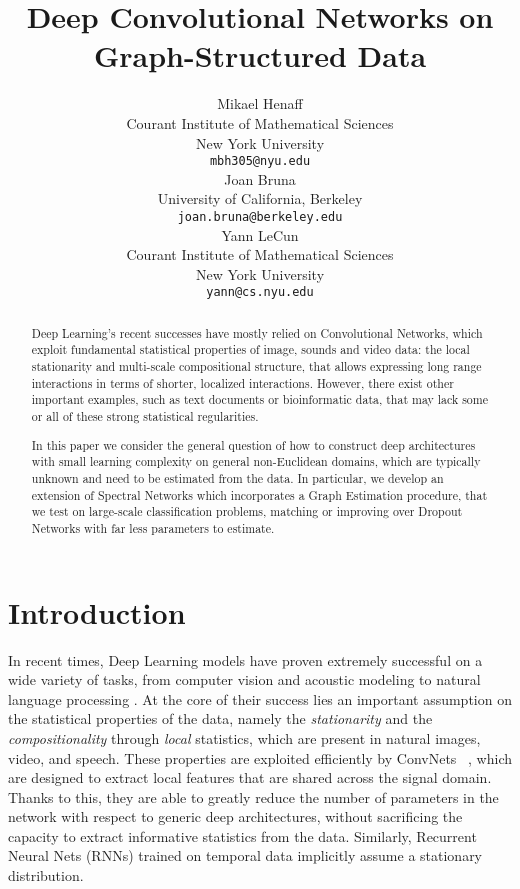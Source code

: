\documentclass{article} %
\title{Deep Convolutional Networks on Graph-Structured Data}
\author{
Mikael Henaff \\
Courant Institute of Mathematical Sciences\\
New York University\\
\texttt{mbh305@nyu.edu} \\
\And
Joan Bruna \\
University of California, Berkeley \\
\texttt{joan.bruna@berkeley.edu} \\
\AND
Yann LeCun \\
Courant Institute of Mathematical Sciences \\
New York University \\
\texttt{yann@cs.nyu.edu} \\
}
\begin{document}
\maketitle

\begin{abstract}
Deep Learning's recent successes have mostly relied on Convolutional Networks, which exploit fundamental statistical properties of image, sounds and video data: the local stationarity and multi-scale compositional structure, that allows expressing long range interactions in terms of shorter, localized interactions. However, there exist other important examples, such as text documents or bioinformatic data, that may lack some or all of these strong statistical regularities. 

In this paper we consider the general question of how to construct deep architectures with small learning complexity on general non-Euclidean domains, which are typically unknown and need to be estimated from the data. In particular, we develop an extension of Spectral Networks which incorporates a Graph Estimation procedure, that we test on large-scale classification problems, matching or improving over Dropout Networks with far less parameters to estimate.
\end{abstract}

\section{Introduction}


In recent times, Deep Learning models have proven extremely successful on a wide variety of tasks, from computer vision and acoustic modeling to natural language processing \cite{natureyann}. At the core of their success lies an important assumption on the statistical properties of the data, namely the \emph{stationarity} and the \emph{compositionality} through \emph{local} statistics, which are present in natural images, video, and speech.
 These properties are exploited efficiently by ConvNets ~\cite{krizhevsky2012,hinton12}, which are designed to extract local features that are shared across the signal domain. Thanks to this, they are able to greatly reduce the number of parameters in the network with respect to generic deep architectures, without sacrificing the capacity to extract informative statistics from the data. Similarly, Recurrent Neural Nets (RNNs) trained on temporal data implicitly assume a stationary distribution.
\end{document}
